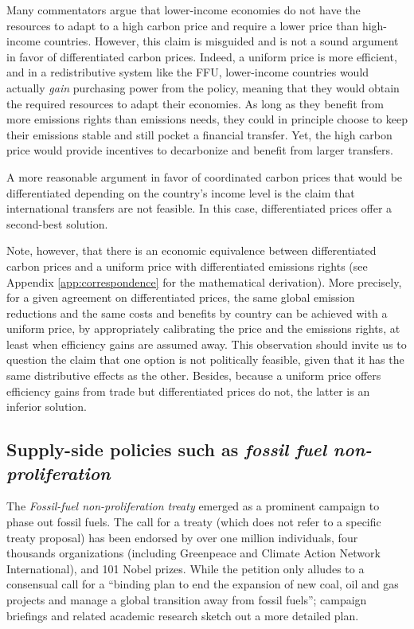 \documentclass[12pt,english]{article}
\begin{document}
Many commentators argue that lower-income economies do not have the resources to adapt to a high carbon price and require a lower price than high-income countries. However, this claim is misguided and is not a sound argument in favor of differentiated carbon prices.\citep{aldy_promise_2012} Indeed, a uniform price is more efficient, and in a redistributive system like the FFU, lower-income countries would actually \textit{gain} purchasing power from the policy, meaning that they would obtain the required resources to adapt their economies. As long as they benefit from more emissions rights than emissions needs, they could in principle choose to keep their emissions stable and still pocket a financial transfer. Yet, the high carbon price would provide incentives to decarbonize and benefit from larger transfers. 

A more reasonable argument in favor of coordinated carbon prices that would be differentiated depending on the country's income level\citep{parry_proposal_2021} is the claim that international transfers are not feasible. In this case, differentiated prices offer a second-best solution. 

Note, however, that there is an economic equivalence between differentiated carbon prices and a uniform price with differentiated emissions rights (see Appendix \ref{app:correspondence} for the mathematical derivation). More precisely, for a given agreement on differentiated prices, the same global emission reductions and the same costs and benefits by country can be achieved with a uniform price, by appropriately calibrating the price and the emissions rights, at least when efficiency gains are assumed away. This observation should invite us to question the claim that one option is not politically feasible, given that it has the same distributive effects as the other. Besides, because a uniform price offers efficiency gains from trade but differentiated prices do not, the latter is an inferior solution.

\subsection{Supply-side policies such as \textit{fossil fuel non-proliferation}}

The \textit{Fossil-fuel non-proliferation treaty} emerged as a prominent campaign to phase out fossil fuels. The call for a treaty (which does not refer to a specific treaty proposal) has been endorsed by over one million individuals, four thousands organizations (including Greenpeace and Climate Action Network International), and 101 Nobel prizes. While the petition only alludes to a consensual call for a ``binding plan to end the expansion of new coal, oil and gas projects and manage a global transition away from fossil fuels''; campaign briefings and related academic research sketch out a more detailed plan.\citep{civil_society_equity_review_fair_2021,civil_society_equity_review_equitable_2023,calverley_phaseout_2022,fossil_fuel_non-proliferation_treaty_global_2023}
\end{document}
